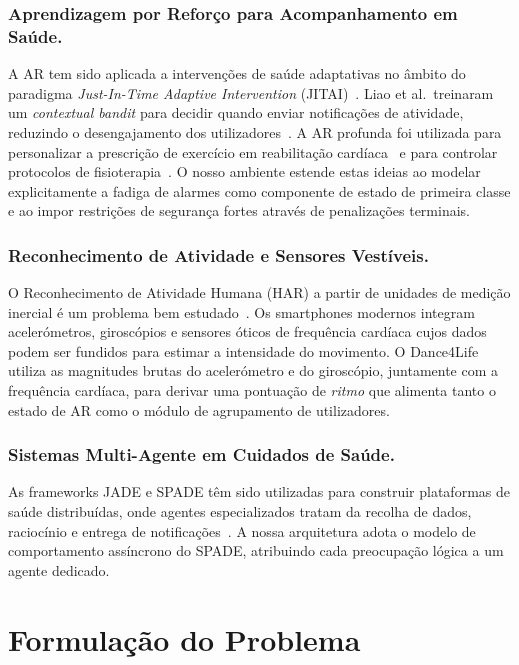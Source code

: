 \documentclass[runningheads]{llncs}
\begin{document}
\subsubsection{Aprendizagem por Reforço para Acompanhamento em Saúde.}
A AR tem sido aplicada a intervenções de saúde adaptativas no âmbito do paradigma
\emph{Just-In-Time Adaptive Intervention} (JITAI)~\cite{tewari2017}.
Liao et al.\ treinaram um \emph{contextual bandit} para decidir quando enviar
notificações de atividade, reduzindo o desengajamento dos
utilizadores~\cite{liao2020}. A AR profunda foi utilizada para personalizar a
prescrição de exercício em reabilitação cardíaca~\cite{escolar2022} e para
controlar protocolos de fisioterapia~\cite{yu2019}. O nosso ambiente estende estas
ideias ao modelar explicitamente a fadiga de alarmes como componente de estado de
primeira classe e ao impor restrições de segurança fortes através de penalizações
terminais.

\subsubsection{Reconhecimento de Atividade e Sensores Vestíveis.}
O Reconhecimento de Atividade Humana (HAR) a partir de unidades de medição inercial
é um problema bem estudado~\cite{banos2014}. Os smartphones modernos integram
acelerómetros, giroscópios e sensores óticos de frequência cardíaca cujos dados
podem ser fundidos para estimar a intensidade do movimento. O Dance4Life utiliza
as magnitudes brutas do acelerómetro e do giroscópio, juntamente com a frequência
cardíaca, para derivar uma pontuação de \emph{ritmo} que alimenta tanto o estado
de AR como o módulo de agrupamento de utilizadores.

\subsubsection{Sistemas Multi-Agente em Cuidados de Saúde.}
As frameworks JADE e SPADE têm sido utilizadas para construir plataformas de saúde
distribuídas, onde agentes especializados tratam da recolha de dados, raciocínio e
entrega de notificações~\cite{mea2007}. A nossa arquitetura adota o modelo de
comportamento assíncrono do SPADE, atribuindo cada preocupação lógica a um agente
dedicado.

%
\section{Formulação do Problema}
\label{sec:formulation}
\end{document}
